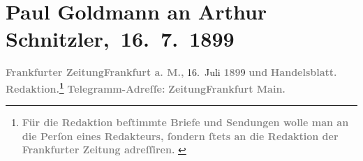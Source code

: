 

         
         \renewcommand{\erwaehntePersonen}{Personen: Richard Beer-Hofmann, Hermann Hettner, Fedor Mamroth}
         \renewcommand{\erwaehnteInstitutionen}{Institutionen: Frankfurter Zeitung, Friedrich Vieweg und Sohn}
         \renewcommand{\erwaehnteOrte}{Orte: Bayreuth, Braunschweig, Florenz, Frankfurt am Main, Italien, Rennes, Rom, Slawonien, Velden am Wörthersee, Wien}
         \renewcommand{\erwaehnteWerke}{Werke: Ein Sommer in China. Reisebilder, Geschichte der französischen Literatur im achtzehnten Jahrhundert}
               \section[ Paul Goldmann an Arthur Schnitzler, 16. 7. 1899]{ Paul Goldmann an Arthur Schnitzler, 16. 7. 1899}\nopagebreak{}\rehead{ }\begin{ledgroupsized}[t]{13cm}\normalsize\beginnumbering \toendnotes[C]{\smallbreak\pagebreak[2]} 
\toendnotes[C]{\smallbreak}\pstart
           \noindent{}{\pb}\textcolor{gray}{\textbf{\textbf{Frankfurter Zeitung}}}\hfill \textcolor{gray}{\textbf{\textbf{Frankfurt a. M.,}}}{ }16. Juli \textcolor{gray}{\textbf{189}}9\pend
           \pstart
           \textcolor{gray}{\textbf{und}}\pend
           \pstart
           \textcolor{gray}{\textbf{Handelsblatt.}}\pend
           \pstart
           \textcolor{gray}{\textbf{\textbf{Redaktion.}\footnote{\noindent{}\textcolor{gray}{\textbf{Für die Redaktion beſtimmte Briefe und Sendungen wolle man
                                  an die Perſon eines Redakteurs,
                              ſondern ſtets \textbf{an die Redaktion der Frankfurter Zeitung} adreſſiren. }}}}}\pend
           \pstart
           \textcolor{gray}{\textbf{Telegramm-Adreſſe:}}\pend
           \pstart
           \textcolor{gray}{\textbf{\textbf{ZeitungFrankfurt Main.}}}\pend

\end{ledgroupsized}
